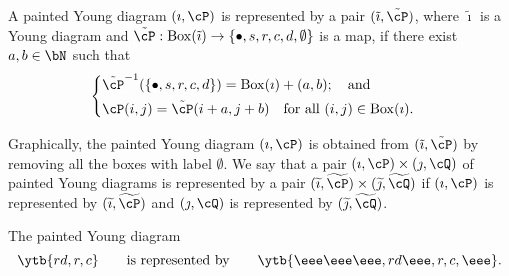 \documentclass[ssunip]{subfiles}
\begin{document}
\begin{defn} A painted Young diagram $(\imath, \cP)$ is represented by    a pair $(\tilde \imath, \tilde \cP)$, where  $\tilde \imath$ is a Young diagram and $\tilde \cP: \mathrm{Box}(\tilde \imath)\rightarrow \{\bullet, s,r,c,d, \emptyset \}$ is a map, if there exist $a,b\in \bN$ such that
      \[
      \begin{cases} 
    \tilde \cP^{-1}(\{\bullet, s, r,c,d\})=\mathrm{Box}(\imath)+(a,b); \quad \textrm{and} &\hbox{} \smallskip\\
  \cP(i,j)=\tilde \cP(i+a,j+b) \quad \textrm{for all  $(i,j)\in \mathrm{Box}(\imath)$.} &\hbox{} \\
  \end{cases} 
          \]
          \end{defn}
  Graphically, the painted Young diagram $(\imath, \cP)$   is obtained from $(\tilde \imath, \tilde \cP)$ by removing all the boxes with label $\emptyset$.  We say that a pair  $(\imath, \cP)\times (\jmath, \cQ)$ of painted Young diagrams is represented by a pair  $(\widetilde \imath, \widetilde \cP)\times (\widetilde \jmath, \widetilde \cQ)$ if $( \imath, \cP)$ is represented by $(\widetilde \imath, \widetilde \cP)$ and $( \jmath, \cQ )$ is represented by $(\widetilde \jmath, \widetilde \cQ )$. 
  
   \begin{Example}
The painted Young diagram
\[
  \ytb{{r}{d},{r},{c} }
\qquad \textrm{is represented by}\qquad 
  \ytb{{\eee}{\eee}{\eee},{r}{d}{\eee},{r},{c},{\eee} }.
\]

  \end{Example}
  
 



%
\end{document}
